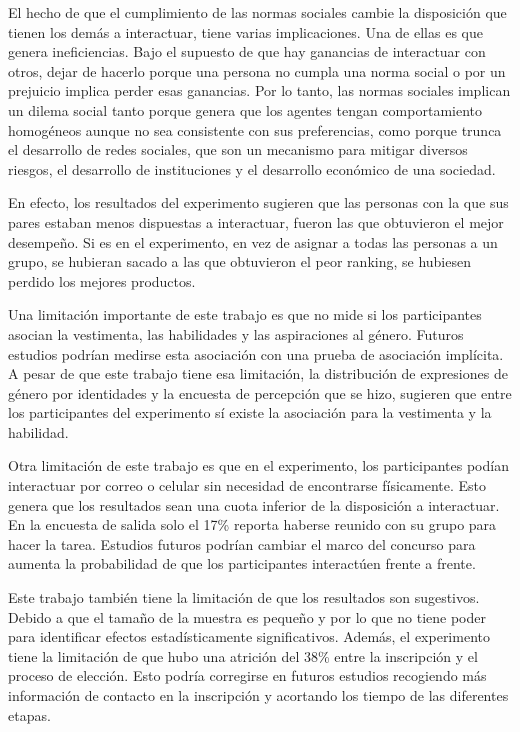 El hecho de que el cumplimiento de las normas sociales cambie la disposición que tienen los demás a interactuar, tiene varias implicaciones. Una de ellas es que genera ineficiencias. Bajo el supuesto de que hay ganancias de interactuar con otros, dejar de hacerlo porque una persona no cumpla una norma social o por un prejuicio implica perder esas ganancias. Por lo tanto, las normas sociales implican un dilema social tanto porque genera que los agentes tengan comportamiento homogéneos aunque no sea consistente con sus preferencias, como porque trunca el desarrollo de redes sociales, que son un mecanismo para mitigar diversos riesgos, el desarrollo de instituciones y el desarrollo económico de una sociedad. 

En efecto, los resultados del experimento sugieren que las personas con la que sus pares estaban menos dispuestas a interactuar, fueron las que obtuvieron el mejor desempeño. Si es en el experimento, en vez de asignar a todas las personas a un grupo, se hubieran sacado a las que obtuvieron el peor ranking, se hubiesen perdido los mejores productos.

Una limitación importante de este trabajo es que no mide si los participantes asocian la vestimenta, las habilidades y las aspiraciones al género. Futuros estudios podrían medirse esta asociación con una prueba de asociación implícita. A pesar de que este trabajo tiene esa limitación, la distribución de expresiones de género por identidades y la encuesta de percepción que se hizo, sugieren que entre los participantes del experimento sí existe la asociación para la vestimenta y la habilidad. 

Otra limitación de este trabajo es que en el experimento, los participantes podían interactuar por correo o celular sin necesidad de encontrarse físicamente. Esto genera que los resultados sean una cuota inferior de la disposición a interactuar. En la encuesta de salida solo el 17\% reporta haberse reunido con su grupo para hacer la tarea. Estudios futuros podrían cambiar el marco del concurso para aumenta la probabilidad de que los participantes interactúen frente a frente. 

Este trabajo también tiene la limitación de que los resultados son sugestivos. Debido a que el tamaño de la muestra es pequeño y por lo que no tiene poder para identificar efectos estadísticamente significativos. Además, el experimento tiene la limitación de que hubo una atrición del 38\% entre la inscripción y el proceso de elección. Esto podría corregirse en futuros estudios recogiendo más información de contacto en la inscripción y acortando los tiempo de las diferentes etapas. 